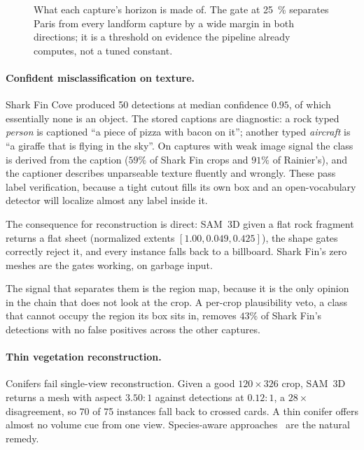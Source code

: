 \begin{figure}[t]
  \centering
  \caption{What each capture's horizon is made of. The gate at \SI{25}{\percent}
  separates Paris from every landform capture by a wide margin in both directions;
  it is a threshold on evidence the pipeline already computes, not a tuned constant.}
  \label{fig:silhouette}
\end{figure}

\paragraph{Confident misclassification on texture.}
Shark Fin Cove produced 50 detections at median confidence $0.95$, of which
essentially none is an object. The stored captions are diagnostic: a rock typed
\emph{person} is captioned ``a piece of pizza with bacon on it''; another typed
\emph{aircraft} is ``a giraffe that is flying in the sky''. On captures with weak
image signal the class is derived from the caption ($59\%$ of Shark Fin crops and
$91\%$ of Rainier's), and the captioner describes unparseable texture fluently
and wrongly. These pass label verification, because a tight cutout fills its own
box and an open-vocabulary detector will localize almost any label inside it.

The consequence for reconstruction is direct: SAM~3D given a flat rock fragment
returns a flat sheet (normalized extents $[1.00, 0.049, 0.425]$), the shape gates
correctly reject it, and every instance falls back to a billboard. Shark Fin's zero
meshes are the gates working, on garbage input.

The signal that separates them is the region map, because it is the only opinion in
the chain that does not look at the crop. A per-crop plausibility veto, a class
that cannot occupy the region its box sits in, removes $43\%$ of Shark Fin's
detections with no false positives across the other captures.

\paragraph{Thin vegetation reconstruction.}
Conifers fail single-view reconstruction. Given a good $120\times326$ crop, SAM~3D
returns a mesh with aspect $3.50{:}1$ against detections at $0.12{:}1$, a
$28\times$ disagreement, so 70 of 75 instances fall back to crossed cards. A thin
conifer offers almost no volume cue from one view. Species-aware
approaches~\cite{lee2024tree} are the natural remedy.

